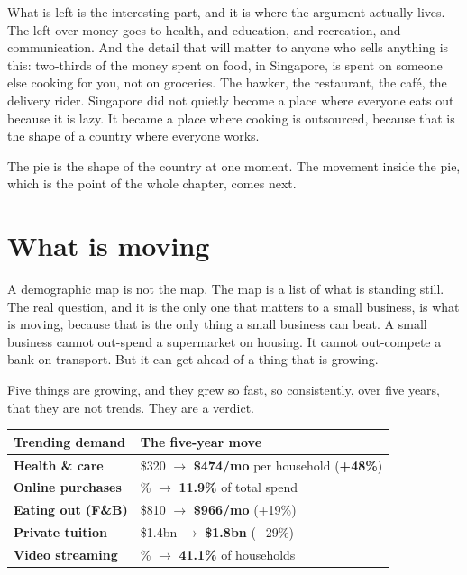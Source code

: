 \documentclass[10pt,twoside,openany]{memoir}
\newcommand{\needspacehead}{\needspace{4\baselineskip}}
\let\oldsection\section
\renewcommand{\section}{\needspacehead\oldsection}
\renewcommand{\arraystretch}{1.1}
\begin{document}
{{{{{{{{{{{{{{{{What is left is the interesting part, and it is where the argument
actually lives. The left-over money goes to health, and education, and
recreation, and communication. And the detail that will matter to anyone
who sells anything is this: two-thirds of the money spent on food, in
Singapore, is spent on someone else cooking for you, not on groceries.
The hawker, the restaurant, the café, the delivery rider. Singapore did
not quietly become a place where everyone eats out because it is lazy.
It became a place where cooking is outsourced, because that is the shape
of a country where everyone works.

The pie is the shape of the country at one moment. The movement inside
the pie, which is the point of the whole chapter, comes next.

\section{What is moving}\label{what-is-moving}

A demographic map is not the map. The map is a list of what is standing
still. The real question, and it is the only one that matters to a small
business, is what is moving, because that is the only thing a small
business can beat. A small business cannot out-spend a supermarket on
housing. It cannot out-compete a bank on transport. But it can get ahead
of a thing that is growing.

Five things are growing, and they grew so fast, so consistently, over
five years, that they are not trends. They are a verdict.

{\def\LTcaptype{none} %
{\renewcommand{\arraystretch}{0.9}\begin{longtable}[]{@{}
  >{\raggedright\arraybackslash}p{}
  >{\raggedright\arraybackslash}p{}@{}}
\toprule\noalign{}
\begin{minipage}[b]{\linewidth}\raggedright
Trending demand
\end{minipage} & \begin{minipage}[b]{\linewidth}\raggedright
The five-year move
\end{minipage} \\
\midrule\noalign{}
\endhead
\bottomrule\noalign{}
\endlastfoot
\textbf{Health \& care} & \$320 \(\rightarrow\) \textbf{\$474/mo} per
household (\textbf{+48\%}) \\
\textbf{Online purchases} & 4.7\% \(\rightarrow\) \textbf{11.9\%} of
total spend \\
\textbf{Eating out (F\&B)} & \$810 \(\rightarrow\) \textbf{\$966/mo}
(+19\%) \\
\textbf{Private tuition} & \$1.4bn \(\rightarrow\) \textbf{\$1.8bn}
(+29\%) \\
\textbf{Video streaming} & 6.9\% \(\rightarrow\) \textbf{41.1\%} of
households \\
\end{longtable}
}

}}}}}}}}}}}}}}}}}
\end{document}
